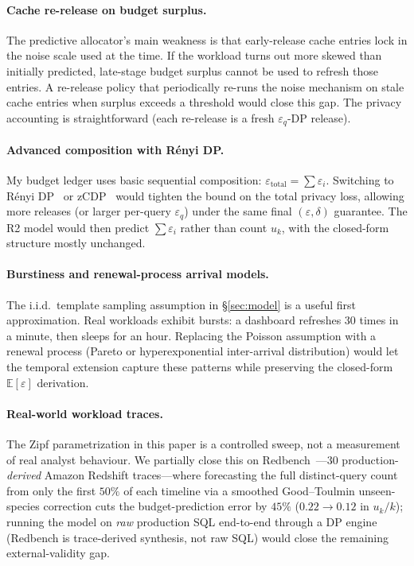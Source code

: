 \documentclass[sigconf,nonacm]{acmart}
\newcommand{\eps}{\varepsilon}
\newcommand{\E}{\mathbb{E}}
\begin{document}
\paragraph{Cache re-release on budget surplus.}
The predictive allocator's main weakness is that early-release cache entries lock in the noise scale used at the time. If the workload turns out more skewed than initially predicted, late-stage budget surplus cannot be used to refresh those entries. A re-release policy that periodically re-runs the noise mechanism on stale cache entries when surplus exceeds a threshold would close this gap. The privacy accounting is straightforward (each re-release is a fresh $\eps_q$-DP release).

\paragraph{Advanced composition with R\'enyi DP.}
My budget ledger uses basic sequential composition: $\eps_{\mathrm{total}} = \sum \eps_i$. Switching to R\'enyi DP~\cite{mironov2017renyi} or zCDP~\cite{bun2016concentrated} would tighten the bound on the total privacy loss, allowing more releases (or larger per-query $\eps_q$) under the same final $(\eps, \delta)$ guarantee. The R2 model would then predict $\sum \eps_i$ rather than count $u_k$, with the closed-form structure mostly unchanged.

\paragraph{Burstiness and renewal-process arrival models.}
The i.i.d.\ template sampling assumption in §\ref{sec:model} is a useful first approximation. Real workloads exhibit bursts: a dashboard refreshes 30 times in a minute, then sleeps for an hour. Replacing the Poisson assumption with a renewal process (Pareto or hyperexponential inter-arrival distribution) would let the temporal extension capture these patterns while preserving the closed-form $\E[\eps]$ derivation.

\paragraph{Real-world workload traces.}
The Zipf parametrization in this paper is a controlled sweep, not a measurement of real analyst behaviour. We partially close this on Redbench~\cite{redbench2025}---$30$ production-\emph{derived} Amazon Redshift traces---where forecasting the full distinct-query count from only the first $50\%$ of each timeline via a smoothed Good--Toulmin unseen-species correction cuts the budget-prediction error by $45\%$ ($0.22\!\to\!0.12$ in $u_k/k$); running the model on \emph{raw} production SQL end-to-end through a DP engine (Redbench is trace-derived synthesis, not raw SQL) would close the remaining external-validity gap.
\end{document}
